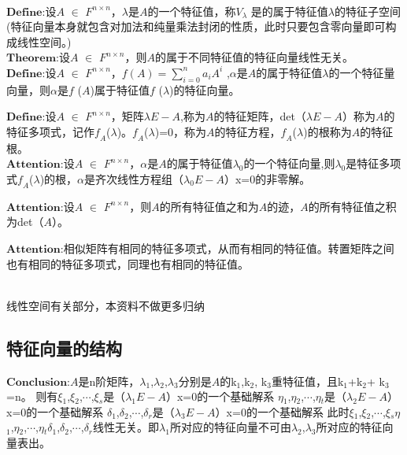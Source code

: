 \documentclass[a4paper,12pt]{book}
\begin{document}
~\\


$\mathbf{Define}$:设$\mathit{A}$ $\in$ $\mathit{F^{n\times n} }$，$\lambda$是$\mathit{A}$的一个特征值，称$\mathit{V_{\lambda } }$ 是的属于特征值$\lambda$的特征子空间(特征向量本身就包含对加法和纯量乘法封闭的性质，此时只要包含零向量即可构成线性空间。) ~\\

$\mathbf{Theorem}$:设$\mathit{A}$ $\in$ $\mathit{F^{n\times n} }$，则$\mathit{A}$的属于不同特征值的特征向量线性无关。~\\

$\mathbf{Define}$:设$\mathit{A}$ $\in$ $\mathit{F^{n\times n} }$，$\mathit{f} (A)=\sum_{\mathit{i=0} }^{n} a_{i} A^{i} $ ,$\alpha$是$\mathit{A}$的属于特征值$\lambda$的一个特征量向量，则$\alpha$是$\mathit{f}$ ($\mathit{A}$)属于特征值$\mathit{f}$ ($\lambda$)的特征向量。

$\mathbf{Define}$:设$\mathit{A}$ $\in$ $\mathit{F^{n\times n} }$，矩阵$\lambda$$\mathit{E-A}$,称为$\mathit{A}$的特征矩阵，det（$\lambda$$\mathit{E-A}$）称为$\mathit{A}$的特征多项式，记作$\mathit{f_{A}}$($\lambda$)。$\mathit{f_{A}}$($\lambda$)=0，称为$\mathit{A}$的特征方程，$\mathit{f_{A}}$($\lambda$)的根称为$\mathit{A}$的特征根。~\\

$\mathbf{Attention}$:设$\mathit{A}$ $\in$ $\mathit{F^{n\times n} }$，$\alpha$是$\mathit{A}$的属于特征值$\lambda$$_{0}$的一个特征向量,则$\lambda$$_{0}$是特征多项式$\mathit{f_{A}}$($\lambda$)的根，$\alpha$是齐次线性方程组（$\lambda$$_{0}$$\mathit{E-A}$）x=0的非零解。

$\mathbf{Attention}$:设$\mathit{A}$ $\in$ $\mathit{F^{n\times n} }$，则$\mathit{A}$的所有特征值之和为$\mathit{A}$的迹，$\mathit{A}$的所有特征值之积为det（$\mathit{A}$）。

$\mathbf{Attention}$:相似矩阵有相同的特征多项式，从而有相同的特征值。转置矩阵之间也有相同的特征多项式，同理也有相同的特征值。



~\\

线性空间有关部分，本资料不做更多归纳

\subsection{特征向量的结构}
$\mathbf{Conclusion}$:$\mathit{A}$是n阶矩阵，$\lambda$$_{1}$,$\lambda$$_{2}$,$\lambda$$_{3}$分别是$\mathit{A}$的k$_{1}$,k$_{2}$,
k$_{3}$重特征值，且k$_{1}$+k$_{2}$+
k$_{3}$=n。
则有$\xi $$_{1}$,$\xi $$_{2}$,$\cdots$,$\xi $$_{s}$是（$\lambda$$_{1}$$\mathit{E-A}$）x=0的一个基础解系
$\eta  $$_{1}$,$\eta  $$_{2}$,$\cdots$,$\eta  $$_{t}$是（$\lambda$$_{2}$$\mathit{E-A}$）x=0的一个基础解系
$\delta  $$_{1}$,$\delta   $$_{2}$,$\cdots$,$\delta   $$_{r}$是（$\lambda$$_{3}$$\mathit{E-A}$）x=0的一个基础解系
此时$\xi $$_{1}$,$\xi $$_{2}$,$\cdots$,$\xi $$_{s}$$\eta  $$_{1}$,$\eta  $$_{2}$,$\cdots$,$\eta  $$_{t}$$\delta  $$_{1}$,$\delta   $$_{2}$,$\cdots$,$\delta   $$_{r}$线性无关。即$\lambda$$_{1}$所对应的特征向量不可由$\lambda$$_{2}$,$\lambda$$_{3}$所对应的特征向量表出。~\\
\end{document}
